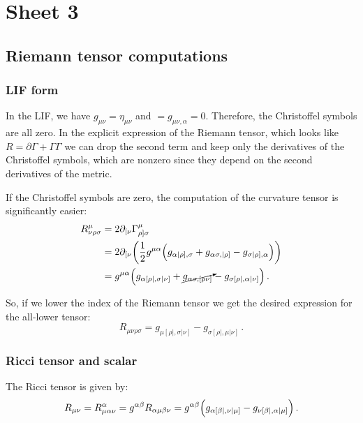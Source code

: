 \documentclass[main.tex]{subfiles}
\begin{document}
\section{Sheet 3}

\subsection{Riemann tensor computations}

\subsubsection{LIF form}

In the LIF, we have \(g_{\mu \nu } = \eta_{\mu \nu }\) and \(= g_{\mu \nu , \alpha }=0\). Therefore, the Christoffel symbols are all zero. 
In the explicit expression of the Riemann tensor, which looks like \(R = \partial \Gamma  + \Gamma \Gamma\) we can drop the second term and keep only the derivatives of the Christoffel symbols, which are nonzero since they depend on the second derivatives of the metric.

If the Christoffel symbols are zero, the computation of the curvature tensor is significantly easier: 
%
\begin{subequations}
\begin{align}
  R^{\mu }_{\nu \rho \sigma }
  &=  2 \partial_{[\nu }\Gamma^{\mu }_{\rho] \sigma }  \\
  &= 2 \partial_{[\nu} \qty(\frac{1}{2} g^{\mu \alpha } \qty(g_{\alpha |\rho], \sigma } + g_{\alpha \sigma , |\rho ]} - g_{\sigma |\rho], \alpha }))  \\
  &= g^{\mu \alpha }\qty(g_{\alpha [\rho|, \sigma | \nu     ]} + \cancelto{}{g_{\alpha \sigma, [\rho \nu ]}}-g_{\sigma [\rho |, \alpha | \nu ]})
\,.
\end{align}
\end{subequations}

So, if we lower the index of the Riemann tensor we get the desired expression for the all-lower tensor: 
%
\begin{equation}
  R_{\mu \nu \rho \sigma} = g_{\mu [\rho|, \sigma | \nu ]} - g_{\sigma [\rho|, \mu | \nu ]} 
\,.
\end{equation}

\subsubsection{Ricci tensor and scalar}

The Ricci tensor is given by: 
%
\begin{equation}
  R_{\mu \nu } = R^{\alpha }_{\mu \alpha \nu } 
  = g^{\alpha \beta }R_{\alpha \mu \beta \nu }
  = g^{\alpha \beta }\qty(g_{\alpha [\beta |, \nu | \mu ]} - g_{\nu  [\beta |, \alpha  | \mu ]})
\,.
\end{equation}
%
\end{document}
